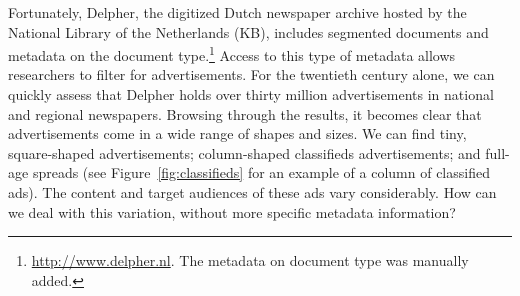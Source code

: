 \documentclass[USenglish]{article}
\begin{document}
Fortunately, Delpher, the digitized Dutch newspaper archive hosted by the National Library of the Netherlands (KB), includes segmented documents and metadata on the document type.\footnote{\url{http://www.delpher.nl}. The metadata on document type was manually added.} Access to this type of metadata  allows researchers to filter for advertisements. For the twentieth century alone, we can quickly assess that Delpher holds over thirty million advertisements in national and regional newspapers. Browsing through the results, it becomes clear that advertisements come in a wide range of shapes and sizes. We can find tiny, square-shaped advertisements;  column-shaped classifieds advertisements; and full-age spreads (see Figure~\ref{fig:classifieds} for an example of a column of classified ads). The content and target audiences of these ads vary considerably. How can we deal with this variation, without more specific metadata information? 
\end{document}
